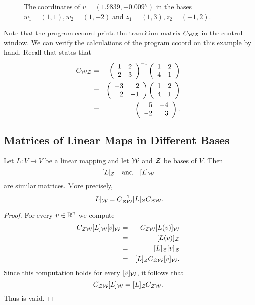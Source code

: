 \documentclass{ximera}
\begin{document}
\begin{figure}[htb]
     \centerline{%
	}
     \caption{The coordinates of $v=(1.9839,-0.0097)$ in the bases
	$w_1=(1,1), w_2=(1,-2)$ and $z_1=(1,3),z_2=(-1,2)$.}
     \label{F:2coords}
\end{figure}

Note that the program {\sf ccoord} prints the transition matrix
$C_{\cal WZ}$ in the \Matlab control window.  We can verify the
calculations of the program {\sf ccoord} on this example by hand.
Recall that  states that
\begin{eqnarray*}
C_{\cal WZ} & = & \left(\begin{array}{rr} 1 & 2\\ 2 &3\end{array}\right)^{-1}\left(\begin{array}{rr} 1 & 2\\ 4 &1\end{array}\right) \\
& = & \left(\begin{array}{rr} -3 & 2\\ 2 &-1\end{array}\right)\left(\begin{array}{rr} 1 & 2\\ 4 &1\end{array}\right) \\
& = & \left(\begin{array}{rr} 5 & -4\\ -2 &3\end{array}\right).
\end{eqnarray*}


\subsection*{Matrices of Linear Maps in Different Bases}

\begin{thm} \label{T:matrixcoord}
Let $L:V\to V$ be a linear mapping and let
${\cal W}$ and ${\cal Z}$ be bases of $V$.  Then
\[
[L]_{\cal Z} \quad\mbox{and}\quad [L]_{\cal W}
\]
are similar  matrices.  More precisely,
\begin{equation}  \label{e:matrixcoord}
[L]_{\cal W} = C_{{\cal Z}{\cal W}}^{-1} [L]_{\cal Z} C_{{\cal Z}{\cal W}}.
\end{equation}
\end{thm}

\begin{proof}  For every $v\in\mbox{$\Bbb{R}$}^n$ we compute
\begin{eqnarray*}
C_{{\cal Z}{\cal W}}[L]_{\cal W}[v]_{\cal W} & = &
C_{{\cal Z}{\cal W}}[L(v)]_{\cal W} \\
& = & [L(v)]_{\cal Z}  \\
& = & [L]_{\cal Z}[v]_{\cal Z} \\
& = & [L]_{\cal Z} C_{{\cal Z}{\cal W}}[v]_{\cal W}.
\end{eqnarray*}
Since this computation holds for every $[v]_{\cal W}$, it follows that
\[
C_{{\cal Z}{\cal W}}[L]_{\cal W} = [L]_{\cal Z} C_{{\cal Z}{\cal W}}.
\]
Thus  is valid.  \end{proof}
\end{document}
